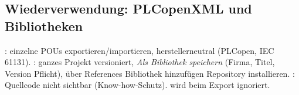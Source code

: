 \subsection{Wiederverwendung: PLCopenXML und Bibliotheken}
\label{sec:biblio}
: einzelne POUs exportieren/importieren, herstellerneutral
(PLCopen, IEC 61131). : ganzes Projekt versioniert, \emph{Als
Bibliothek speichern} (Firma, Titel, Version Pflicht), über References
\ra Bibliothek hinzufügen \ra Repository installieren.
: Quellcode nicht sichtbar (Know-how-Schutz). 
wird beim Export ignoriert.
